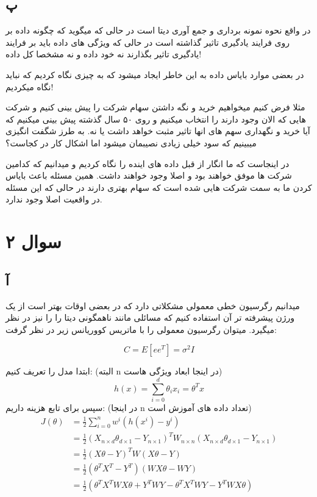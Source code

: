 \documentclass{article}[12pt]
\begin{document}
\subsection{پ}
در واقع نحوه نمونه برداری و جمع آوری دیتا است در حالی که 
میگوید که چگونه داده بر روی فرایند یادگیری تاثیر گذاشته است در حالی که ویژگی های داده باید بر فرایند یادگیری تاثیر بگذارند نه خود داده و نه مشخصا کل داده! 

در بعضی موارد بایاس داده به این خاطر ایجاد میشود که به چیزی نگاه کردیم که نباید نگاه میکردیم! 

مثلا فرض کنیم میخواهیم خرید و نگه داشتن سهام شرکت را پیش بینی کنیم و شرکت هایی که الان وجود دارند را انتخاب میکنیم و روی ۵۰ سال گذشته پیش بینی میکنیم که آیا
خرید و نگهداری سهم های انها تاثیر مثبت خواهد داشت یا نه. به طرز شگفت انگیزی میبینیم که سود خیلی زیادی نصیبمان میشود اما اشکال کار در کجاست؟

در اینجاست که ما انگار از قبل داده های اینده را نگاه کردیم و میدانیم که کدامین شرکت ها موفق خواهند بود و اصلا وجود خواهند داشت. 
همین مسئله باعث بایاس کردن ما به سمت شرکت هایی شده است که سهام بهتری دارند در حالی که این مسئله در واقعیت اصلا وجود ندارد. 
\section{سوال ۲}
\subsection{آ}
میدانیم رگرسیون خطی معمولی مشکلاتی دارد که در بعضی اوقات بهتر است از یک ورژن پیشرفته تر آن استفاده کنیم که مسائلی مانند ناهمگونی دیتا را را نیز 
در نظر میگیرد. 
میتوان رگرسیون معمولی را با ماتریس کووریانس زیر در نظر گرفت:

\begin{equation*}
C = E[e e^T] = \sigma^2 I
\end{equation*}


 
ابتدا مدل را تعریف کنیم:
(البته n
در اینجا ابعاد ویژگی هاست)
\begin{equation*}
h(x) = \sum_{i=0}^{d} \theta_i x_i = \theta ^T x
\end{equation*}
سپس برای تابع هزینه داریم:
(در اینجا n تعداد داده های آموزش است)
\begin{equation*}
\begin{split}
J(\theta) &=\frac{1}{2} \sum_{i=0}^n w^i (h(x^i)-y^i) \\&= \frac{1}{2}
(X_{n \times d}\theta_{d\times 1}-Y_{n\times 1})^T W_{n\times n}
(X_{n \times d}\theta_{d\times 1}-Y_{n\times 1}) 
\\&=\frac{1}{2} (X\theta-Y)^T W (X\theta-Y) 
\\&= 
\frac{1}{2}
(\theta^T X^T - Y^T)(WX\theta - WY)
\\
&= 
\frac{1}{2}
(\theta^T X^T W X\theta +Y^T W Y - \theta^T X^T W Y - Y^T W X \theta)
\end{split}
\end{equation*}
\end{document}
